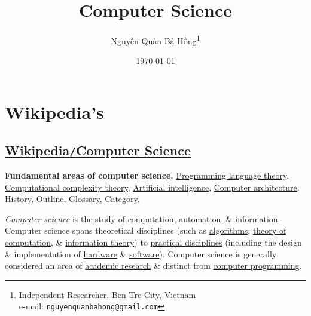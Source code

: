 \documentclass[oneside]{book}
\title{Computer Science}
\author{\selectlanguage{vietnamese} Nguyễn Quản Bá Hồng\footnote{Independent Researcher, Ben Tre City, Vietnam\\e-mail: \texttt{nguyenquanbahong@gmail.com}}}
\date{\today}
\numberwithin{equation}{section}
\begin{document}
\maketitle
\tableofcontents


\chapter{Wikipedia's}

\section{\href{https://en.wikipedia.org/wiki/Computer_science}{Wikipedia\texttt{/}Computer Science}}
\textsf{\textbf{Fundamental areas of computer science.} \href{https://en.wikipedia.org/wiki/Programming_language_theory}{Programming language theory}, \href{https://en.wikipedia.org/wiki/Computational_complexity_theory}{Computational complexity theory}, \href{https://en.wikipedia.org/wiki/Artificial_intelligence}{Artificial intelligence}, \href{https://en.wikipedia.org/wiki/Computer_architecture}{Computer architecture}.} \href{https://en.wikipedia.org/wiki/History_of_computer_science}{History}, \href{https://en.wikipedia.org/wiki/Outline_of_computer_science}{Outline}, \href{https://en.wikipedia.org/wiki/Glossary_of_computer_science}{Glossary}, \href{https://en.wikipedia.org/wiki/Category:Computer_science}{Category}.

\textit{Computer science} is the study of \href{https://en.wikipedia.org/wiki/Computation}{computation}, \href{https://en.wikipedia.org/wiki/Automation}{automation}, \& \href{https://en.wikipedia.org/wiki/Information}{information}. Computer science spans theoretical disciplines (such as \href{https://en.wikipedia.org/wiki/Algorithm}{algorithms}, \href{https://en.wikipedia.org/wiki/Theory_of_computation}{theory of computation}, \& \href{https://en.wikipedia.org/wiki/Information_theory}{information theory}) to \href{https://en.wikipedia.org/wiki/Applied_science}{practical disciplines} (including the design \& implementation of \href{https://en.wikipedia.org/wiki/Computer_architecture}{hardware} \& \href{https://en.wikipedia.org/wiki/Computer_programming}{software}). Computer science is generally considered an area of \href{https://en.wikipedia.org/wiki/Research}{academic research} \& distinct from \href{https://en.wikipedia.org/wiki/Computer_programming}{computer programming}. 
\end{document}
